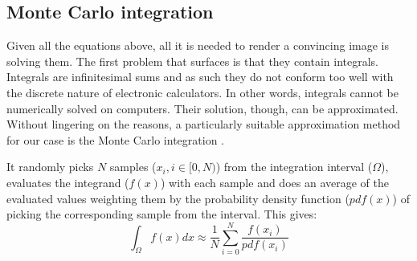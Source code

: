 
\subsection{Monte Carlo integration}

Given all the equations above, all it is needed to render a convincing image is solving them. The first problem that surfaces is that they contain integrals. Integrals are infinitesimal sums and as such they do not conform too well with the discrete nature of electronic calculators. In other words, integrals cannot be numerically solved on computers. Their solution, though, can be approximated. Without lingering on the reasons, a particularly suitable approximation method for our case is the Monte Carlo integration \cite{kalos2009monte}.

It randomly picks $N$ samples ($x_i, i \in [0,N)$) from the integration interval ($\Omega$), evaluates the integrand ($f(x)$) with each sample and does an average of the evaluated values weighting them by the probability density function ($pdf(x)$) of picking the corresponding sample from the interval. This gives:
\begin{equation}
	\int_{\Omega}f(x)dx \approx \frac{1}{N} \sum_{i=0}^{N} \frac{f(x_i)}{pdf(x_i)}
	\label{montecarlo}
\end{equation}

